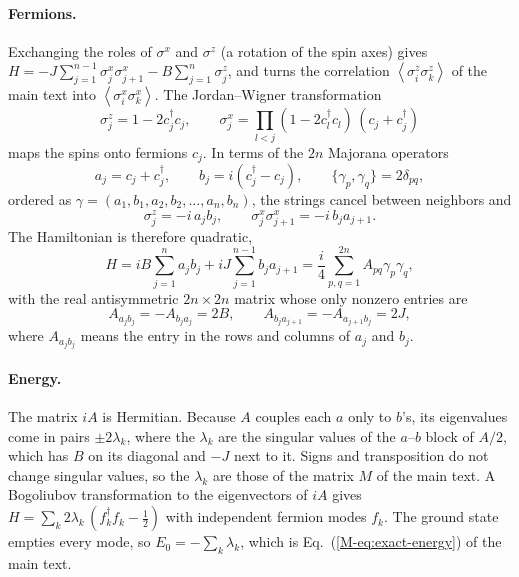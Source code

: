 \documentclass[aps,prb,preprint,amsmath,amssymb,nofootinbib,longbibliography]{revtex4-2}
\newcommand{\ev}[1]{\left\langle #1 \right\rangle}
\begin{document}
\paragraph*{Fermions.}
Exchanging the roles of $\sigma^x$ and $\sigma^z$ (a rotation of the spin axes) gives $H = -J\sum_{j=1}^{n-1}
\sigma^x_j\sigma^x_{j+1} - B\sum_{j=1}^n \sigma^z_j$, and turns the correlation $\ev{\sigma^z_i\sigma^z_k}$ of the
main text into $\ev{\sigma^x_i\sigma^x_k}$. The Jordan--Wigner transformation\cite{jordan1928}
\begin{equation}
  \sigma^z_j = 1 - 2c_j^\dagger c_j, \qquad \sigma^x_j = \prod_{l<j}(1 - 2c_l^\dagger c_l)\,(c_j + c_j^\dagger)
\end{equation}
maps the spins onto fermions $c_j$. In terms of the $2n$ Majorana operators
\begin{equation}
  a_j = c_j + c_j^\dagger, \qquad b_j = i(c_j^\dagger - c_j), \qquad \{\gamma_p, \gamma_q\} = 2\delta_{pq},
\end{equation}
ordered as $\gamma = (a_1, b_1, a_2, b_2, \ldots, a_n, b_n)$, the strings cancel between neighbors and
\begin{equation}
  \sigma^z_j = -i\,a_j b_j, \qquad \sigma^x_j\sigma^x_{j+1} = -i\,b_j a_{j+1} .
  \label{eq:majorana-spins}
\end{equation}
The Hamiltonian is therefore quadratic,
\begin{equation}
  H = iB\sum_{j=1}^n a_j b_j + iJ\sum_{j=1}^{n-1} b_j a_{j+1} = \frac{i}{4}\sum_{p,q=1}^{2n} A_{pq}\gamma_p\gamma_q ,
\end{equation}
with the real antisymmetric $2n\times 2n$ matrix whose only nonzero entries are
\begin{equation}
  A_{a_j b_j} = -A_{b_j a_j} = 2B, \qquad A_{b_j a_{j+1}} = -A_{a_{j+1} b_j} = 2J ,
  \label{eq:majorana-matrix}
\end{equation}
where $A_{a_j b_j}$ means the entry in the rows and columns of $a_j$ and $b_j$.

\paragraph*{Energy.}
The matrix $iA$ is Hermitian. Because $A$ couples each $a$ only to $b$'s, its eigenvalues come in pairs $\pm
2\lambda_k$, where the $\lambda_k$ are the singular values of the $a$--$b$ block of $A/2$, which has $B$ on its
diagonal and $-J$ next to it. Signs and transposition do not change singular values, so the $\lambda_k$ are those of
the matrix $M$ of the main text. A Bogoliubov transformation to the eigenvectors of $iA$ gives $H = \sum_k
2\lambda_k\,(f_k^\dagger f_k - \tfrac12)$ with independent fermion modes $f_k$. The ground state empties every mode,
so $E_0 = -\sum_k\lambda_k$, which is Eq.~(\ref{M-eq:exact-energy}) of the main text.
\end{document}
